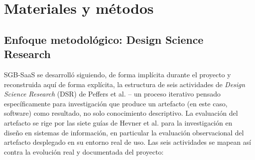 \chapter{Materiales y métodos}
\label{cap:materiales-metodos}

\section{Enfoque metodológico: Design Science Research}

SGB-SaaS se desarrolló siguiendo, de forma implícita durante el proyecto
y reconstruida aquí de forma explícita, la estructura de seis actividades
de \emph{Design Science Research} (DSR) de Peffers et al.
\citep{peffers2007dsrm} -- un proceso
iterativo pensado específicamente para investigación que produce un
artefacto (en este caso, software) como resultado, no solo conocimiento
descriptivo. La evaluación del artefacto se rige por las siete guías de
Hevner et al. \citep{hevner2004design} para la investigación en diseño
en sistemas de información, en particular la evaluación observacional
del artefacto desplegado en su entorno real de uso. Las seis actividades se mapean así contra la evolución real
y documentada del proyecto:

